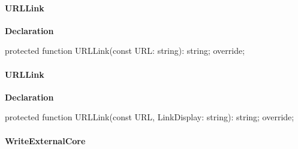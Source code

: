 \documentclass{report}
\newif\ifpdf
\begin{document}
\paragraph*{URLLink}\hspace*{\fill}

\label{PasDoc_GenLatex.TTexDocGenerator-URLLink}
\begin{list}{}{
\setlength{\itemindent}{0cm}
\setlength{\listparindent}{0cm}
\setlength{\leftmargin}{\evensidemargin}
\addtolength{\leftmargin}{\tmplength}
\settowidth{\labelsep}{X}
\addtolength{\leftmargin}{\labelsep}
\setlength{\labelwidth}{\tmplength}
}
\item[\textbf{Declaration}\hfill]
\ifpdf
\begin{flushleft}
\fi
\begin{ttfamily}
protected function URLLink(const URL: string): string; override;\end{ttfamily}

\ifpdf
\end{flushleft}
\fi

\end{list}
\paragraph*{URLLink}\hspace*{\fill}

\label{PasDoc_GenLatex.TTexDocGenerator-URLLink}
\begin{list}{}{
\setlength{\itemindent}{0cm}
\setlength{\listparindent}{0cm}
\setlength{\leftmargin}{\evensidemargin}
\addtolength{\leftmargin}{\tmplength}
\settowidth{\labelsep}{X}
\addtolength{\leftmargin}{\labelsep}
\setlength{\labelwidth}{\tmplength}
}
\item[\textbf{Declaration}\hfill]
\ifpdf
\begin{flushleft}
\fi
\begin{ttfamily}
protected function URLLink(const URL, LinkDisplay: string): string; override;\end{ttfamily}

\ifpdf
\end{flushleft}
\fi

\end{list}
\paragraph*{WriteExternalCore}\hspace*{\fill}
\end{document}
